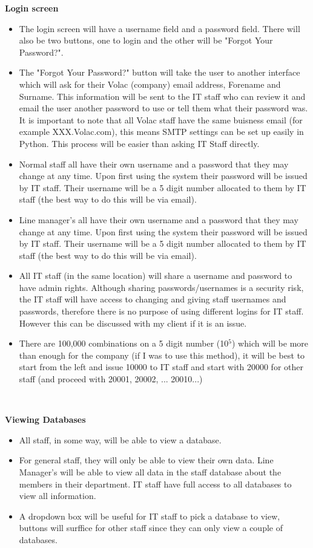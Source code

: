 \textbf{Login screen}
\begin{itemize}
\item The login screen will have a username field and a password field. There will also be two buttons, one to login and the other will be "Forgot Your Password?".
\item The "Forgot Your Password?" button will take the user to another interface which will ask for their Volac (company) email address, Forename and Surname. This information will be sent to the IT staff who can review it and email the user another password to use or tell them what their password was. It is important to note that all Volac staff have the same buisness email (for example XXX.Volac.com), this means SMTP settings can be set up easily in Python. This process will be easier than asking IT Staff directly.
\item Normal staff all have their own username and a password that they may change at any time. Upon first using the system their password will be issued by IT staff. Their username will be a 5 digit number allocated to them by IT staff (the best way to do this will be via email). 
\item Line manager's all have their own username and a password that they may change at any time. Upon first using the system their password will be issued by IT staff. Their username will be a 5 digit number allocated to them by IT staff (the best way to do this will be via email). 
\item All IT staff (in the same location) will share a username and password to have admin rights. Although sharing passwords/usernames is a security risk, the IT staff will have access to changing and giving staff usernames and passwords, therefore there is no purpose of using different logins for IT staff. However this can be discussed with my client if it is an issue.
\item There are 100,000 combinations on a 5 digit number (10$^5$) which will be more than enough for the company (if I was to use this method), it will be best to start from the left and issue 10000 to IT staff and start with 20000 for other staff (and proceed with 20001, 20002, ... 20010...)
\end{itemize}

\

\textbf{Viewing Databases}

\begin{itemize}
\item All staff, in some way, will be able to view a database.
\item For general staff, they will only be able to view their own data. Line Manager's will be able to view all data in the staff database about the members in their department. IT staff have full access to all databases to view all information.
\item A dropdown box will be useful for IT staff to pick a database to view, buttons will surffice for other staff since they can only view a couple of databases.
\end{itemize}

